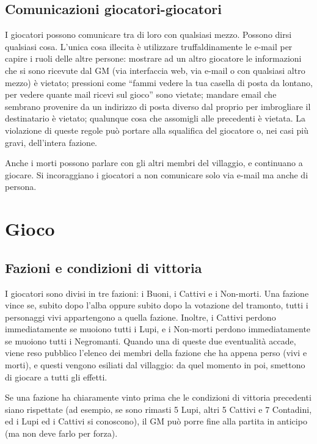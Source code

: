 \documentclass[a4paper,10pt]{article}
\begin{document}
\subsection{Comunicazioni giocatori-giocatori}

I giocatori possono comunicare tra di loro con qualsiasi mezzo. Possono dirsi qualsiasi cosa.
L’unica cosa illecita è utilizzare truffaldinamente le e-mail per capire i ruoli delle altre persone: mostrare ad un altro giocatore le informazioni che si sono ricevute dal GM (via interfaccia web, via e-mail o con qualsiasi altro mezzo) è vietato; pressioni come ``fammi vedere la tua casella di posta da lontano, per vedere quante mail ricevi sul gioco'' sono vietate; mandare email che sembrano provenire da un indirizzo di posta diverso dal proprio per imbrogliare il destinatario è vietato; qualunque cosa che assomigli alle precedenti è vietata. La violazione di queste regole può portare alla squalifica del giocatore o, nei casi più gravi, dell'intera fazione.

Anche i morti possono parlare con gli altri membri del villaggio, e continuano a giocare. Si incoraggiano i giocatori a non comunicare solo via e-mail ma anche di persona.


\pagebreak
\section{Gioco}


\subsection{Fazioni e condizioni di vittoria}

I giocatori sono divisi in tre fazioni: i Buoni, i Cattivi e i Non-morti.
Una fazione vince se, subito dopo l'alba oppure subito dopo la votazione del tramonto, tutti i personaggi vivi appartengono a quella fazione.
Inoltre, i Cattivi perdono immediatamente se muoiono tutti i Lupi, e i Non-morti perdono immediatamente se muoiono tutti i Negromanti. Quando una di queste due eventualità accade, viene reso pubblico l'elenco dei membri della fazione che ha appena perso (vivi e morti), e questi vengono esiliati dal villaggio: da quel momento in poi, smettono di giocare a tutti gli effetti.

Se una fazione ha chiaramente vinto prima che le condizioni di vittoria precedenti siano rispettate (ad esempio, se sono rimasti 5 Lupi, altri 5 Cattivi e 7 Contadini, ed i Lupi ed i Cattivi si conoscono), il GM può porre fine alla partita in anticipo (ma non deve farlo per forza).
\end{document}
